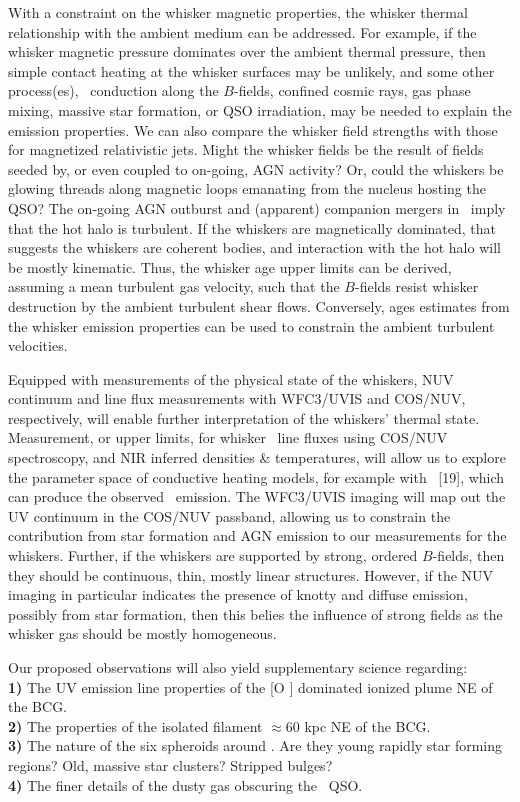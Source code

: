 \documentclass[11pt]{article}
\begin{document}
With a constraint on the whisker magnetic properties, the whisker
thermal relationship with the ambient medium can be addressed. For
example, if the whisker magnetic pressure dominates over the ambient
thermal pressure, then simple contact heating at the whisker surfaces
may be unlikely, and some other process(es), \eg\ conduction along the
$B$-fields, confined cosmic rays, gas phase mixing, massive star
formation, or QSO irradiation, may be needed to explain the emission
properties. We can also compare the whisker field strengths with those
for magnetized relativistic jets. Might the whisker fields be the
result of fields seeded by, or even coupled to on-going, AGN activity?
Or, could the whiskers be glowing threads along magnetic loops
emanating from the nucleus hosting the QSO? The on-going AGN outburst
and (apparent) companion mergers in \irs\ imply that the hot halo is
turbulent. If the whiskers are magnetically dominated, that suggests
the whiskers are coherent bodies, and interaction with the hot halo
will be mostly kinematic. Thus, the whisker age upper limits can be
derived, assuming a mean turbulent gas velocity, such that the
$B$-fields resist whisker destruction by the ambient turbulent shear
flows. Conversely, ages estimates from the whisker emission properties
can be used to constrain the ambient turbulent velocities.

Equipped with measurements of the physical state of the whiskers, NUV
continuum and line flux measurements with WFC3/UVIS and COS/NUV,
respectively, will enable further interpretation of the whiskers'
thermal state. Measurement, or upper limits, for whisker \civ\ line
fluxes using COS/NUV spectroscopy, and NIR inferred densities \&
temperatures, will allow us to explore the parameter space of
conductive heating models, for example with \cloudy\ [19], which can
produce the observed \civ\ emission. The WFC3/UVIS imaging will map
out the UV continuum in the COS/NUV passband, allowing us to constrain
the contribution from star formation and AGN emission to our
measurements for the whiskers. Further, if the whiskers are supported
by strong, ordered $B$-fields, then they should be continuous, thin,
mostly linear structures. However, if the NUV imaging in particular
indicates the presence of knotty and diffuse emission, possibly from
star formation, then this belies the influence of strong fields as the
whisker gas should be mostly homogeneous.

Our proposed observations will also yield supplementary science
regarding:\\
{\bf{1)}} The UV emission line properties of the [O ]
dominated ionized plume NE of the BCG.\\
{\bf{2)}} The properties of the isolated filament $\approx 60$ kpc NE
of the BCG.\\
{\bf{3)}} The nature of the six spheroids around \irs. Are they young
rapidly star forming regions? Old, massive star clusters? Stripped
bulges?\\
{\bf{4)}} The finer details of the dusty gas obscuring the
\irs\ QSO.
\end{document}
